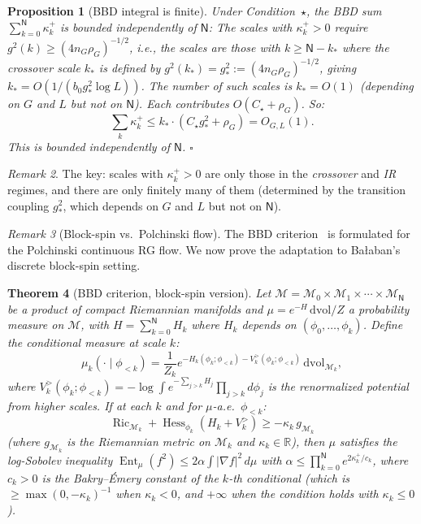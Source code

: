 \documentclass[11pt,a4paper]{article}
\theoremstyle{plain}
\newtheorem{theorem}{Theorem}[section]
\newtheorem{proposition}[theorem]{Proposition}
\theoremstyle{definition}
\theoremstyle{remark}
\newtheorem{remark}[theorem]{Remark}
\newcommand{\R}{\mathbb{R}}
\newcommand{\Ent}{\operatorname{Ent}}
\newcommand{\Hess}{\operatorname{Hess}}
\newcommand{\Ric}{\operatorname{Ric}}
\newcommand{\cM}{\mathcal{M}}
\begin{document}
\begin{proposition}[BBD integral is finite]
\label{prop:bbd_finite}
Under Condition~$\star$, the BBD sum
$\sum_{k=0}^{\mathsf{N}} \kappa_k^+$ is bounded independently
of $\mathsf{N}$:
The scales with $\kappa_k^+ > 0$ require
$g^2(k) \ge (4n_G\rho_G)^{-1/2}$, i.e., the scales are
those with $k \ge \mathsf{N} - k_*$ where the
\emph{crossover scale} $k_*$ is defined by
$g^2(k_*) = g_*^2 := (4n_G\rho_G)^{-1/2}$, giving
$k_* = O(1/(b_0 g_*^2 \log L))$. The number of such
scales is $k_* = O(1)$ (depending on $G$ and $L$ but
not on $\mathsf{N}$). Each contributes $O(C_\star + \rho_G)$. So:
\begin{equation}
  \sum_k \kappa_k^+ \le k_* \cdot (C_\star g_*^2 + \rho_G)
  = O_{G,L}(1).
\end{equation}
This is bounded independently of $\mathsf{N}$. $\square$
\end{proposition}

\begin{remark}
The key: scales with $\kappa_k^+ > 0$ are only those
in the \emph{crossover} and \emph{IR} regimes, and there
are only finitely many of them (determined by the
transition coupling $g_*^2$, which depends on $G$ and $L$
but not on $\mathsf{N}$).
\end{remark}

\begin{remark}[Block-spin vs.\ Polchinski flow]\label{rem:bbd_adapt}
The BBD criterion~\cite{BBD24} is formulated for the
Polchinski continuous RG flow. We now prove the
adaptation to Ba{\l}aban's discrete block-spin setting.
\end{remark}

\begin{theorem}[BBD criterion, block-spin version]
\label{thm:bbd_blockspin}
Let $\cM = \cM_0 \times \cM_1 \times \cdots \times
\cM_{\mathsf{N}}$ be a product of compact Riemannian manifolds
and $\mu = e^{-H}\,\mathrm{dvol}/Z$ a probability measure
on $\cM$, with $H = \sum_{k=0}^{\mathsf{N}} H_k$ where $H_k$
depends on $(\phi_0, \ldots, \phi_k)$. Define the
conditional measure at scale $k$:
\[
  \mu_k(\cdot \mid \phi_{<k}) = \frac{1}{Z_k}
  e^{-H_k(\phi_k; \phi_{<k})
  - V_k^{>}(\phi_k; \phi_{<k})}\,\mathrm{dvol}_{\cM_k},
\]
where $V_k^{>}(\phi_k;\phi_{<k}) = -\log\int
e^{-\sum_{j>k} H_j}\prod_{j>k} d\phi_j$ is the
renormalized potential from higher scales. If at each
$k$ and for $\mu$-a.e.\ $\phi_{<k}$:
\begin{equation}\label{eq:bbd_bs_cond}
  \Ric_{\cM_k} + \Hess_{\phi_k}(H_k + V_k^{>})
  \ge -\kappa_k\,g_{\cM_k}
\end{equation}
(where $g_{\cM_k}$ is the Riemannian metric on $\cM_k$
and $\kappa_k \in \R$),
then $\mu$ satisfies the log-Sobolev inequality
$\Ent_\mu(f^2) \le 2\alpha\int|\nabla f|^2\,d\mu$
with $\alpha \le \prod_{k=0}^{\mathsf{N}} e^{2\kappa_k^+/c_k}$,
where $c_k > 0$ is the Bakry--\'Emery constant of the
$k$-th conditional (which is $\ge \max(0, -\kappa_k)^{-1}$
when $\kappa_k < 0$, and $+\infty$ when the condition
holds with $\kappa_k \le 0$).
\end{theorem}
\end{document}
